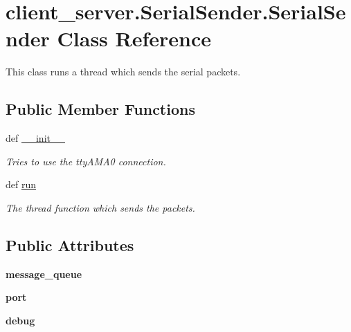 \hypertarget{classclient__server_1_1SerialSender_1_1SerialSender}{\section{client\+\_\+server.\+Serial\+Sender.\+Serial\+Sender Class Reference}
\label{classclient__server_1_1SerialSender_1_1SerialSender}
}


This class runs a thread which sends the serial packets.  


\subsection*{Public Member Functions}
\begin{DoxyCompactItemize}
\item 
def \hyperlink{classclient__server_1_1SerialSender_1_1SerialSender_ad7434beefc94829291a179987cefe283}{\+\_\+\+\_\+init\+\_\+\+\_\+}
\begin{DoxyCompactList}\small\item\em Tries to use the tty\+A\+M\+A0 connection. \end{DoxyCompactList}\item 
def \hyperlink{classclient__server_1_1SerialSender_1_1SerialSender_a18db9998870e82f1062392cf041e4b62}{run}
\begin{DoxyCompactList}\small\item\em The thread function which sends the packets. \end{DoxyCompactList}\end{DoxyCompactItemize}
\subsection*{Public Attributes}
\begin{DoxyCompactItemize}
\item 
\hypertarget{classclient__server_1_1SerialSender_1_1SerialSender_a0e3dc9a4170c85ee5ffd371ca667296e}{{\bfseries message\+\_\+queue}}\label{classclient__server_1_1SerialSender_1_1SerialSender_a0e3dc9a4170c85ee5ffd371ca667296e}

\item 
\hypertarget{classclient__server_1_1SerialSender_1_1SerialSender_aba7a9a371d64637dc27fa551907e9ee9}{{\bfseries port}}\label{classclient__server_1_1SerialSender_1_1SerialSender_aba7a9a371d64637dc27fa551907e9ee9}

\item 
\hypertarget{classclient__server_1_1SerialSender_1_1SerialSender_a682bff898f8e21996281ee32d62a4a26}{{\bfseries debug}}\label{classclient__server_1_1SerialSender_1_1SerialSender_a682bff898f8e21996281ee32d62a4a26}

\end{DoxyCompactItemize}


